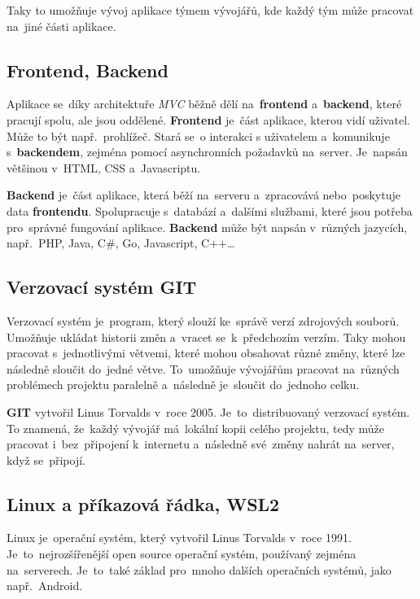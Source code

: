 \documentclass[14pt,a4paper]{article}
\begin{document}
        Taky to umožňuje vývoj aplikace týmem vývojářů, kde každý tým může pracovat na~jiné části aplikace.

        \subsection{Frontend, Backend}
        Aplikace se~díky architektuře \emph{MVC} běžně dělí na~\textbf{frontend} a~\textbf{backend}, které pracují spolu, ale jsou oddělené.
        \textbf{Frontend} je~část aplikace, kterou vidí uživatel. Může to být např.~prohlížeč. Stará se~o interakci s uživatelem a~komunikuje s~\textbf{backendem},
        zejména pomocí asynchronních požadavků na~server. Je~napsán většinou v~HTML, CSS a~Javascriptu.

        \textbf{Backend} je~část aplikace, která běží na~serveru a~zpracovává nebo~poskytuje data \textbf{frontendu}.
        Spolupracuje s~databází a~dalšími službami, které jsou potřeba pro~správné fungování aplikace.
        \textbf{Backend} může být napsán v~různých jazycích, např.~PHP, Java, C\#, Go, Javascript, C++\dots


        \subsection{Verzovací systém GIT}
        Verzovací systém je~program, který slouží ke~správě verzí zdrojových souborů.
        Umožňuje ukládat historii změn a~vracet se~k~předchozím verzím. Taky mohou pracovat s~jednotlivými větvemi,
        které mohou obsahovat různé změny, které lze následně sloučit do~jedné větve.
        To~umožňuje vývojářům pracovat na~různých problémech projektu paralelně a~následně je~sloučit do~jednoho celku.

        \textbf{GIT} vytvořil Linus Torvalds v~roce 2005. Je~to~distribuovaný verzovací systém. To znamená, že~každý vývojář má~lokální kopii celého projektu,
        tedy může pracovat i~bez~připojení k~internetu a~následně své~změny nahrát na~server, když se~připojí.

        \subsection{Linux a příkazová řádka, WSL2}
        Linux je~operační systém, který vytvořil Linus Torvalds v~roce 1991. Je~to~nejrozšířenější open source operační systém,
        používaný zejména na~serverech. Je~to~také základ pro~mnoho dalších operačních systémů, jako např.~Android.
        
\end{document}
